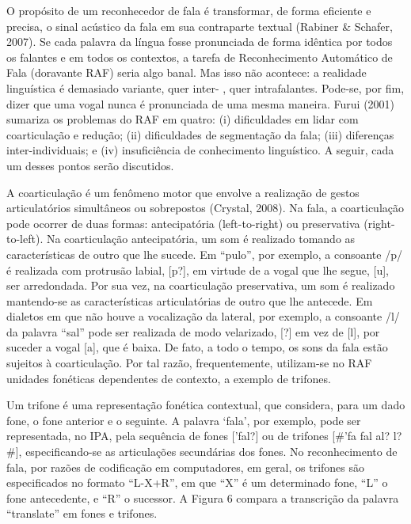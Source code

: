 O prop\'osito de um reconhecedor de fala \'e transformar, de forma eficiente
e precisa, o sinal ac\'ustico da fala em sua contraparte textual (Rabiner
\& Schafer, 2007). Se cada palavra da l\'ingua fosse pronunciada de forma
id\^entica por todos os falantes e em todos os contextos, a tarefa de
Reconhecimento Autom\'atico de Fala (doravante RAF) seria algo banal. Mas
isso n\~ao acontece: a realidade lingu\'istica \'e demasiado variante, quer
inter- , quer intrafalantes. Pode-se, por fim, dizer que uma vogal nunca
\'e pronunciada de uma mesma maneira. Furui (2001) sumariza os problemas
do RAF em quatro: (i) dificuldades em lidar com coarticula\c{c}\~ao e redu\c{c}\~ao;
(ii) dificuldades de segmenta\c{c}\~ao da fala; (iii) diferen\c{c}as
inter-individuais; e (iv) insufici\^encia de conhecimento lingu\'istico. A
seguir, cada um desses pontos ser\~ao discutidos.

A coarticula\c{c}\~ao \'e um  fen\^omeno  motor  que  envolve  a  realiza\c{c}\~ao  de
gestos articulat\'orios simult\^aneos ou sobrepostos (Crystal, 2008). Na
fala, a coarticula\c{c}\~ao pode ocorrer de duas formas: antecipat\'oria
(left-to-right) ou preservativa (right-to-left). Na coarticula\c{c}\~ao
antecipat\'oria, um som \'e realizado tomando as caracter\'isticas de outro
que lhe sucede. Em ``pulo'', por exemplo, a consoante /p/ \'e realizada
com protrus\~ao labial, {[}p?{]}, em virtude de a vogal que lhe segue,
{[}u{]}, ser arredondada. Por sua vez, na coarticula\c{c}\~ao preservativa, um
som \'e realizado mantendo-se as caracter\'isticas articulat\'orias de outro
que lhe antecede. Em dialetos em que n\~ao houve a vocaliza\c{c}\~ao da lateral,
por exemplo, a consoante /l/ da palavra ``sal'' pode ser realizada de
modo velarizado, {[}?{]} em vez de {[}l{]}, por suceder a vogal {[}a{]},
que \'e baixa. De fato, a todo o tempo, os sons da fala est\~ao sujeitos à
coarticula\c{c}\~ao. Por tal raz\~ao, frequentemente, utilizam-se no RAF
unidades fon\'eticas dependentes de contexto, a exemplo de trifones.

Um trifone \'e uma representa\c{c}\~ao fon\'etica contextual, que considera, para
um dado fone, o fone anterior e o seguinte. A palavra `fala', por
exemplo, pode ser representada, no IPA, pela sequ\^encia de fones
{[}'fal?{]} ou de trifones {[}\#'fa fal al? l?\#{]}, especificando-se as
articula\c{c}\~oes secund\'arias dos fones. No reconhecimento de fala, por
raz\~oes de codifica\c{c}\~ao em computadores, em geral, os trifones s\~ao
especificados no formato ``L-X+R'', em que ``X'' \'e um determinado fone,
``L'' o fone antecedente, e ``R'' o sucessor. A Figura 6 compara a
transcri\c{c}\~ao da palavra ``translate'' em fones e trifones.

